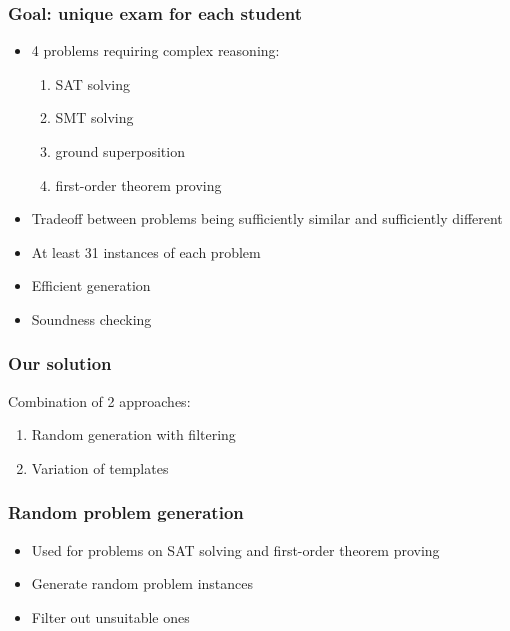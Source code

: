 \documentclass[xcolor={table}]{beamer}
\begin{document}


\begin{frame}
\frametitle{Goal: unique exam for each student}
\begin{itemize}
\item 4 problems requiring complex reasoning:
    \begin{enumerate}
        \item SAT solving
        \item SMT solving
        \item ground superposition
        \item first-order theorem proving
    \end{enumerate}
\item Tradeoff between problems being sufficiently similar and sufficiently different
\item At least 31 instances of each problem
\item Efficient generation
\item Soundness checking
\end{itemize}
\end{frame}



\begin{frame}
\frametitle{Our solution}
Combination of 2 approaches:
\begin{enumerate}
\item Random generation with filtering
\item Variation of templates
\end{enumerate}
\end{frame}



\begin{frame}
\frametitle{Random problem generation}
\begin{itemize}
\item Used for problems on SAT solving and first-order theorem proving
\item Generate random problem instances
\item Filter out unsuitable ones
\end{itemize}
\end{frame}
\end{document}
